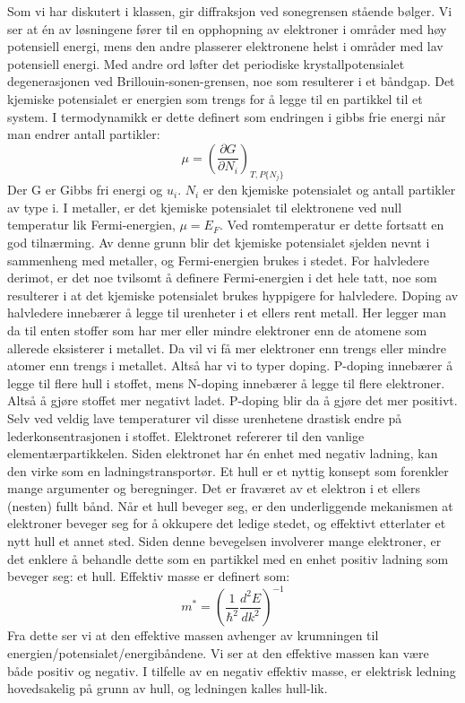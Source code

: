 \documentclass{article}
\begin{document}
Som vi har diskutert i klassen, gir diffraksjon ved sonegrensen stående bølger. Vi ser at én av løsningene fører til en opphopning av elektroner i områder med høy potensiell energi, mens den andre plasserer elektronene helst i områder med lav potensiell energi. Med andre ord løfter det periodiske krystallpotensialet degenerasjonen ved Brillouin-sonen-grensen, noe som resulterer i et båndgap.
\nyside
{}
Det kjemiske potensialet er energien som trengs for å legge til en partikkel til et system. I termodynamikk er dette definert som endringen i gibbs frie energi når man endrer antall partikler:
\begin{equation}
    \mu = \left(\frac{\partial G}{\partial N_i}\right)_{T, P \{N_j\}}
\end{equation}
Der G er Gibbs fri energi og $u_i$. $N_i$ er den kjemiske potensialet og antall partikler av type i. I metaller, er det kjemiske potensialet til elektronene ved null temperatur lik Fermi-energien, $\mu = E_F$. Ved romtemperatur er dette fortsatt en god tilnærming. Av denne grunn blir det kjemiske potensialet sjelden nevnt i sammenheng med metaller, og Fermi-energien brukes i stedet. For halvledere derimot, er det noe tvilsomt å definere Fermi-energien i det hele tatt, noe som resulterer i at det kjemiske potensialet brukes hyppigere for halvledere.
Doping av halvledere innebærer å legge til urenheter i et ellers rent metall. Her legger man da til enten stoffer som har mer eller mindre elektroner enn de atomene som allerede eksisterer i metallet. Da vil vi få mer elektroner enn trengs eller mindre atomer enn trengs i metallet. Altså har vi to typer doping. P-doping innebærer å legge til flere hull i stoffet, mens N-doping innebærer å legge til flere elektroner. Altså å gjøre stoffet mer negativt ladet. P-doping blir da å gjøre det mer positivt. Selv ved veldig lave temperaturer vil disse urenhetene drastisk endre på lederkonsentrasjonen i stoffet.
Elektronet refererer til den vanlige elementærpartikkelen. Siden elektronet har én enhet med negativ ladning, kan den virke som en ladningstransportør. Et hull er et nyttig konsept som forenkler mange argumenter og beregninger. Det er fraværet av et elektron i et ellers (nesten) fullt bånd. Når et hull beveger seg, er den underliggende mekanismen at elektroner beveger seg for å okkupere det ledige stedet, og effektivt etterlater et nytt hull et annet sted. Siden denne bevegelsen involverer mange elektroner, er det enklere å behandle dette som en partikkel med en enhet positiv ladning som beveger seg: et hull.
Effektiv masse er definert som:
\begin{equation}
    m^* = \left(\frac{1}{\hbar^2} \frac{d^2 E}{dk^2}\right)^{-1}
\end{equation}
Fra dette ser vi at den effektive massen avhenger av krumningen til energien/potensialet/energibåndene. 
Vi ser at den effektive massen kan være både positiv og negativ. I tilfelle av en negativ effektiv masse, er elektrisk ledning hovedsakelig på grunn av hull, og ledningen kalles hull-lik.
\end{document}
